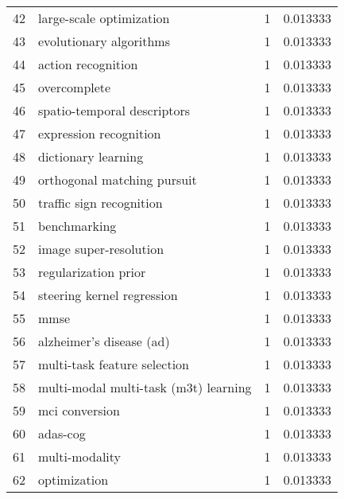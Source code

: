 \begin{tabular}{llrr}
42 &                        large-scale optimization &           1 &    0.013333 \\
43 &                         evolutionary algorithms &           1 &    0.013333 \\
44 &                              action recognition &           1 &    0.013333 \\
45 &                                    overcomplete &           1 &    0.013333 \\
46 &                     spatio-temporal descriptors &           1 &    0.013333 \\
47 &                          expression recognition &           1 &    0.013333 \\
48 &                             dictionary learning &           1 &    0.013333 \\
49 &                     orthogonal matching pursuit &           1 &    0.013333 \\
50 &                        traffic sign recognition &           1 &    0.013333 \\
51 &                                    benchmarking &           1 &    0.013333 \\
52 &                          image super-resolution &           1 &    0.013333 \\
53 &                            regularization prior &           1 &    0.013333 \\
54 &                      steering kernel regression &           1 &    0.013333 \\
55 &                                            mmse &           1 &    0.013333 \\
56 &                        alzheimer's disease (ad) &           1 &    0.013333 \\
57 &                    multi-task feature selection &           1 &    0.013333 \\
58 &           multi-modal multi-task (m3t) learning &           1 &    0.013333 \\
59 &                                  mci conversion &           1 &    0.013333 \\
60 &                                        adas-cog &           1 &    0.013333 \\
61 &                                  multi-modality &           1 &    0.013333 \\
62 &                                    optimization &           1 &    0.013333 \\

\end{tabular}
